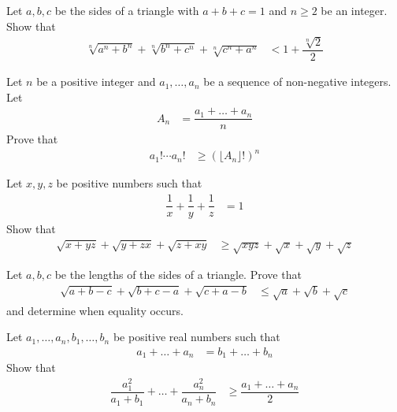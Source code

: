 \documentclass{subfile}
\begin{document}
		\begin{problem}
			Let $a,b,c$ be the sides of a triangle with $a+b+c=1$ and $n\geq2$ be an integer. Show that
				\begin{align*}
					\sqrt[n]{a^{n}+b^{n}}+\sqrt[n]{b^{n}+c^{n}}+\sqrt[n]{c^{n}+a^{n}}
						& < 1+\dfrac{\sqrt[n]{2}}{2}
				\end{align*}
		\end{problem}
	
		\begin{problem}
			Let $n$ be a positive integer and $a_{1},\ldots,a_{n}$ be a sequence of non-negative integers. Let
				\begin{align*}
					A_{n}
						& = \dfrac{a_{1}+\ldots+a_{n}}{n}
				\end{align*}
			Prove that
				\begin{align*}
					a_{1}!\cdots a_{n}!
						& \geq (\lfloor A_{n}\rfloor!)^{n}
				\end{align*}
		\end{problem}
	
		\begin{problem}
			Let $x,y,z$ be positive numbers such that
				\begin{align*}
					\dfrac{1}{x}+\dfrac{1}{y}+\dfrac{1}{z}
						& = 1
				\end{align*}
			Show that
				\begin{align*}
					\sqrt{x+yz}+\sqrt{y+zx}+\sqrt{z+xy}
						& \geq\sqrt{xyz}+\sqrt{x}+\sqrt{y}+\sqrt{z}
				\end{align*}
		\end{problem}
	
		\begin{problem}
			Let $a,b,c$ be the lengths of the sides of a triangle. Prove that
				\begin{align*}
					\sqrt{a+b-c}+\sqrt{b+c-a}+\sqrt{c+a-b}
						& \leq \sqrt{a}+\sqrt{b}+\sqrt{c}
				\end{align*}
			and determine when equality occurs.
		\end{problem}
	
		\begin{problem}
			Let $a_{1},\ldots,a_{n},b_{1},\ldots,b_{n}$ be positive real numbers such that
				\begin{align*}
					a_{1}+\ldots+a_{n}
						& = b_{1}+\ldots+b_{n}
				\end{align*}
			Show that
				\begin{align*}
					\dfrac{a_{1}^{2}}{a_{1}+b_{1}}+\ldots+\dfrac{a_{n}^{2}}{a_{n}+b_{n}}
						& \geq\dfrac{a_{1}+\ldots+a_{n}}{2}
				\end{align*}
		\end{problem}
	
\end{document}
